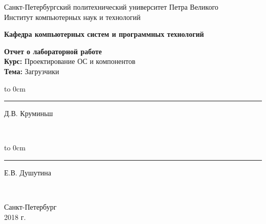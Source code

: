 	\begin{titlepage}
		\begin{center}
			\large {Санкт-Петербургский политехнический университет Петра Великого\\
				Институт компьютерных наук и технологий}\\
		\end{center}
		\begin{center}
			\large\textbf {Кафедра компьютерных систем и программных технологий}
		\end{center}
		\vfill
		\begin{center}
			\large{\textbf{Отчет о лабораторной работе} \\
			\textbf{Курс: } Проектирование ОС и компонентов\\
			\textbf{Тема: } Загрузчики}
		\end{center}
		
		\vfill
		
		\hfill\parbox{9 cm}{\hspace*{3cm}\hbox to 0cm{\raisebox{-1em}{\small(подпись)}}\hspace*{-0.8cm}\rule{3cm}{0.8pt} Д.В. Круминьш}\\[0.6cm]
		
		 \hfill\parbox{9 cm}{\hspace*{3cm}\hbox to 0cm{\raisebox{-1em}{\small(подпись)}}\hspace*{-0.8cm}\rule{3cm}{0.8pt} Е.В. Душутина}\\[0.6cm]
		
		\vspace{\fill}
		\begin{center}
			Санкт-Петербург \\ 2018 г.
		\end{center}
	\end{titlepage}
\setcounter{page}{2}